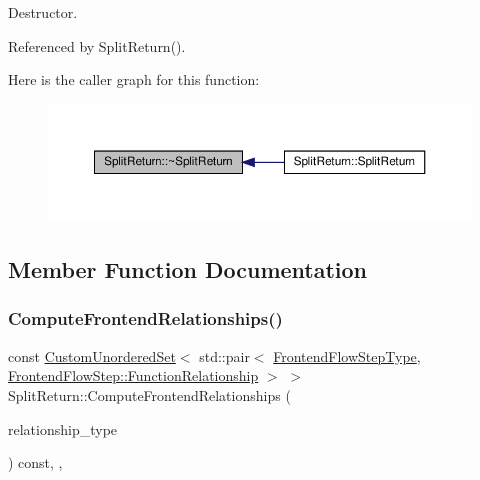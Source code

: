 Destructor. 



Referenced by Split\+Return().

Here is the caller graph for this function\+:
\nopagebreak
\begin{figure}[H]
\begin{center}
\leavevmode
\includegraphics[width=350pt]{d1/d3d/classSplitReturn_a1785d270d9d6e274c10d0918d032cff6_icgraph}
\end{center}
\end{figure}


\subsection{Member Function Documentation}
\mbox{\label{classSplitReturn_a2f9de3a552fe9dc6841b4f1565181b71}} 
\subsubsection{\texorpdfstring{Compute\+Frontend\+Relationships()}{ComputeFrontendRelationships()}}
{\footnotesize\ttfamily const \hyperlink{classCustomUnorderedSet}{Custom\+Unordered\+Set}$<$ std\+::pair$<$ \hyperlink{frontend__flow__step_8hpp_afeb3716c693d2b2e4ed3e6d04c3b63bb}{Frontend\+Flow\+Step\+Type}, \hyperlink{classFrontendFlowStep_af7cf30f2023e5b99e637dc2058289ab0}{Frontend\+Flow\+Step\+::\+Function\+Relationship} $>$ $>$ Split\+Return\+::\+Compute\+Frontend\+Relationships (\begin{DoxyParamCaption}\item[{const \hyperlink{classDesignFlowStep_a723a3baf19ff2ceb77bc13e099d0b1b7}{Design\+Flow\+Step\+::\+Relationship\+Type}}]{relationship\+\_\+type }\end{DoxyParamCaption}) const\hspace{0.3cm}{\ttfamily [override]}, {\ttfamily [private]}, {\ttfamily [virtual]}}



